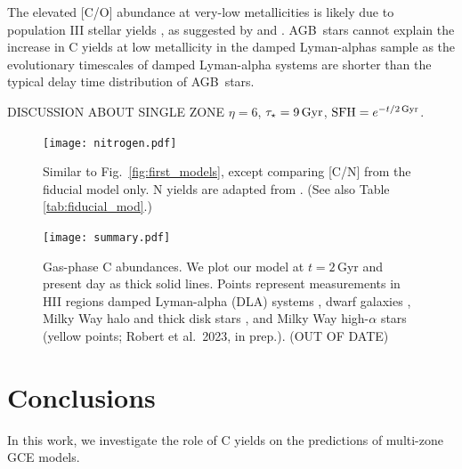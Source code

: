 \documentclass[fleqn,usenatbib]{mnras}
\newcommand{\citealtjack}{Robert et al.~2023, in prep.}
\newcommand{\agb}{AGB}
\newcommand{\gce}{GCE}
\begin{document}
The elevated [C/O] abundance at very-low metallicities is likely due to population III stellar yields \citep[e.g.][]{hirschi07}, as suggested by \citet{cooke+17} and \citet{FN15}. \agb\ stars cannot explain the increase in C yields at low metallicity in the damped Lyman-alphas sample as the evolutionary timescales of damped Lyman-alpha systems are shorter than the typical delay time distribution of \agb\ stars.

DISCUSSION ABOUT SINGLE ZONE
$\eta=6$, $\tau_{\star}=9\,{\rm Gyr}$, ${\rm SFH} = e^{-t/2{\rm\,Gyr}}$.

\begin{figure}
    \centering
    \texttt{[image: nitrogen.pdf]}
    \caption[C/N Abundance Agreement]{Similar to Fig.~\ref{fig:first_models}, except comparing [C/N] from the fiducial model only. N yields are adapted from \cite{james+23}. (See also Table \ref{tab:fiducial_mod}.)
    }
\end{figure}

\begin{figure}
\centering
\texttt{[image: summary.pdf]}
\caption[Gas-Phase Abundances]{Gas-phase C abundances. We plot our model at $t=2$\,Gyr and present day as thick solid lines. Points represent measurements in 
    HII regions    \citep[pink circles;][]{skillman+20, esteban+02, esteban+09, esteban+14, esteban+19}
    damped Lyman-alpha (DLA) systems \citep[blue triangles;][]{ellison+10, srianand+10, dutta+14, DZ+03, pettini+08, morrison+16,cooke+17},  %
    dwarf galaxies \citep[red diamonds;][]{berg+19},
    Milky Way halo and thick disk stars \citep[green stars;][]{nissen+14, fabbian+09},
    and Milky Way high-$\alpha$ stars (yellow points; \citealtjack).
    (OUT OF DATE)
}
\label{fig:gas_phase}
\end{figure}


\section{Conclusions}

In this work, we investigate the role of C yields on the predictions of multi-zone \gce{} models. 
\end{document}
